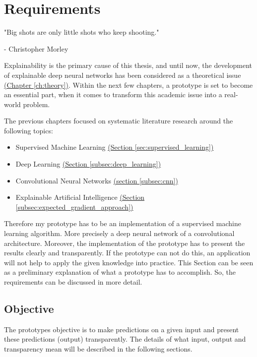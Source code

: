 
\chapter{Requirements}\label{ch:requirements}
\epigraph{"Big shots are only little shots who keep shooting."}{- Christopher Morley}

Explainability is the primary cause of this thesis, and until now, the development of explainable deep neural networks has been considered as a theoretical issue \hyperref[ch:theory]{(Chapter \ref{ch:theory})}. Within the next few chapters, a prototype is set to become an essential part, when it comes to transform this academic issue into a real-world problem. 

The previous chapters focused on systematic literature research around the following topics:  
\begin{itemize}
	\item Supervised Machine Learning \hyperref[sec:supervised_learning]{(Section \ref{sec:supervised_learning})}
	\item Deep Learning \hyperref[subsec:deep_learning]{(Section \ref{subsec:deep_learning})}
	\item Convolutional Neural Networks \hyperref[subsec:cnn]{(section \ref{subsec:cnn})}
	\item Explainable Artificial Intelligence \hyperref[subsec:expected_gradient_approach]{ (Section \ref{subsec:expected_gradient_approach})}
\end{itemize}

Therefore my prototype has to be an implementation of a supervised machine learning algorithm. More precisely a deep neural network of a convolutional architecture. Moreover, the implementation of the prototype has to present the results clearly and transparently. If the prototype can not do this, an application will not help to apply the given knowledge into practice. This Section can be seen as a preliminary explanation of what a prototype has to accomplish. So, the requirements can be discussed in more detail. 

\section{Objective}

The prototypes objective is to make predictions on a given input and present these predictions (output) transparently. The details of what input, output and transparency mean will be described in the following sections.


